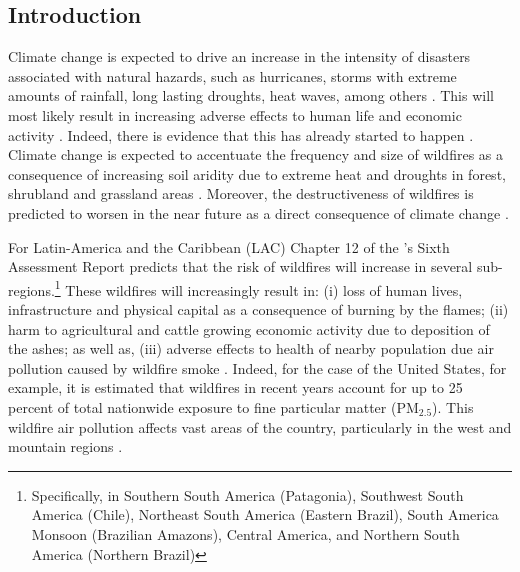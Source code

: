 \documentclass[11pt]{article}
\begin{document}
\begin{spacing}{1.3}

\section{Introduction}

Climate change is expected to drive an increase in the intensity of disasters associated with natural hazards, such as hurricanes, storms with extreme amounts of rainfall, long lasting droughts, heat waves, among others \citep{IPCC2022climate}. This will most likely result in increasing adverse effects to human life and economic activity \citep{IPCC2022climate}. Indeed, there is evidence that this has already started to happen \citep{coronese2019evidence}. Climate change is expected to accentuate the frequency and size of wildfires as a consequence of increasing soil aridity due to extreme heat and droughts in forest, shrubland and grassland areas \citep{malevsky2008assessment, gillett2004detecting, pyne2019fire}. Moreover, the destructiveness of wildfires is predicted to worsen in the near future as a direct consequence of climate change \citep{abatzoglou2016impact, bowman2017human, flannigan2009impacts, flannigan2013global}.

For Latin-America and the Caribbean (LAC) Chapter 12 of the \cite{IPCC2022climate}’s Sixth Assessment Report predicts that the risk of wildfires will increase in several sub-regions.\footnote{Specifically, in Southern South America (Patagonia), Southwest South America (Chile), Northeast South America (Eastern Brazil), South America Monsoon (Brazilian Amazons), Central America, and Northern South America (Northern Brazil)} These wildfires will increasingly result in: (i) loss of human lives, infrastructure and physical capital as a consequence of burning by the flames; (ii) harm to agricultural and cattle growing economic activity due to deposition of the ashes; as well as, (iii) adverse effects to health of nearby population due air pollution caused by wildfire smoke \citep{flannigan2009impacts,bowman2017human,cancelo2018incendios}. Indeed, for the case of the United States, for example, it is estimated that wildfires in recent years account for up to 25 percent of total nationwide exposure to fine particular matter (PM$_{2.5}$). This wildfire air pollution affects vast areas of the country, particularly in the west and mountain regions \citep{burke2021changing}. 


\end{spacing}
\end{document}
